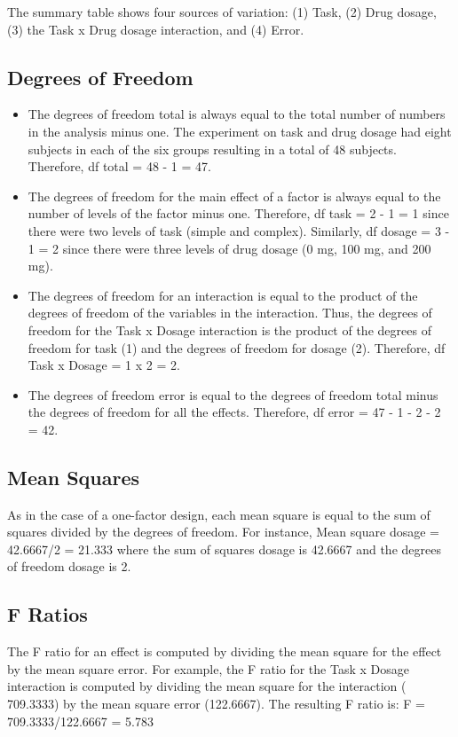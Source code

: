 \documentclass[12pt, a4paper]{report}
\theoremstyle{plain}
\theoremstyle{definition}
\theoremstyle{remark}
\begin{document}
The summary table shows four sources of variation: (1) Task, (2) Drug dosage, (3) the Task x Drug dosage interaction, and (4) Error.

\subsection{Degrees of Freedom}

\begin{itemize}
\item The degrees of freedom total is always equal to the total number of numbers in the analysis minus one. The experiment on task and drug dosage had eight subjects in each of the six groups resulting in a total of 48 subjects. Therefore, df total = 48 - 1 = 47.

\item The degrees of freedom for the main effect of a factor is always equal to the number of levels of the factor minus one. Therefore, df task = 2 - 1 = 1 since there were two levels of task (simple and complex). Similarly, df dosage = 3 - 1 = 2 since there were three levels of drug dosage (0 mg, 100 mg, and 200 mg).

\item The degrees of freedom for an interaction is equal to the product of the degrees of freedom of the variables in the interaction. Thus, the degrees of freedom for the Task x Dosage interaction is the product of the degrees of freedom for task (1) and the degrees of freedom for dosage (2). Therefore, df Task x Dosage = 1 x 2 = 2.

\item The degrees of freedom error is equal to the degrees of freedom total minus the degrees of freedom for all the effects. Therefore, df error = 47 - 1 - 2 - 2 = 42.
\end{itemize}

\subsection{Mean Squares}
As in the case of a one-factor design, each mean square is equal to the sum of squares divided by the degrees of freedom. For instance, Mean square dosage = 42.6667/2 = 21.333 where the sum of squares dosage is 42.6667 and the degrees of freedom dosage is 2.


\subsection{F Ratios}
The F ratio for an effect is computed by dividing the mean square for the effect by the mean square error. For example, the F ratio for the Task x Dosage interaction is computed by dividing the mean square for the interaction ( 709.3333) by the mean square error (122.6667). The resulting F ratio is: F = 709.3333/122.6667 = 5.783
\end{document}
